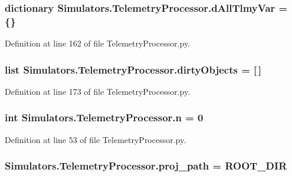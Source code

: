 \subsubsection[{d\+All\+Tlmy\+Var}]{\setlength{\rightskip}{0pt plus 5cm}dictionary Simulators.\+Telemetry\+Processor.\+d\+All\+Tlmy\+Var = \{\}}\label{namespace_simulators_1_1_telemetry_processor_a937de4fb49355315e9cf23ca29d51a3a}


Definition at line 162 of file Telemetry\+Processor.\+py.

\hypertarget{namespace_simulators_1_1_telemetry_processor_aa425ba047b0408bf6e05f599222c6bee}{}
\subsubsection[{dirty\+Objects}]{\setlength{\rightskip}{0pt plus 5cm}list Simulators.\+Telemetry\+Processor.\+dirty\+Objects = \mbox{[}$\,$\mbox{]}}\label{namespace_simulators_1_1_telemetry_processor_aa425ba047b0408bf6e05f599222c6bee}


Definition at line 173 of file Telemetry\+Processor.\+py.

\hypertarget{namespace_simulators_1_1_telemetry_processor_adc73b3fce91792369a602ff747603555}{}
\subsubsection[{n}]{\setlength{\rightskip}{0pt plus 5cm}int Simulators.\+Telemetry\+Processor.\+n = 0}\label{namespace_simulators_1_1_telemetry_processor_adc73b3fce91792369a602ff747603555}


Definition at line 53 of file Telemetry\+Processor.\+py.

\hypertarget{namespace_simulators_1_1_telemetry_processor_a9d556f1e0ebadc73e343a76eec24be68}{}
\subsubsection[{proj\+\_\+path}]{\setlength{\rightskip}{0pt plus 5cm}Simulators.\+Telemetry\+Processor.\+proj\+\_\+path = {\bf R\+O\+O\+T\+\_\+\+D\+I\+R}}\label{namespace_simulators_1_1_telemetry_processor_a9d556f1e0ebadc73e343a76eec24be68}



